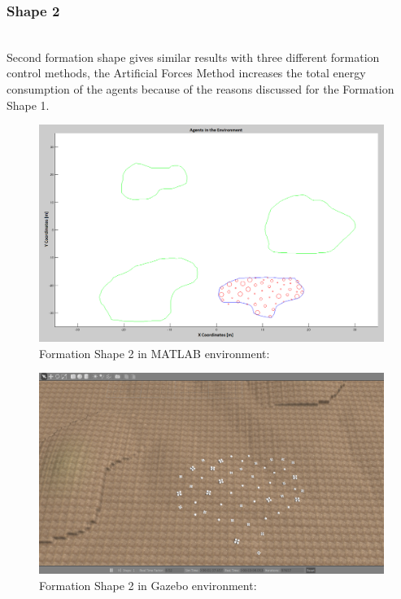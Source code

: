 \subsubsection{Shape 2}\hspace{0pt} \\
Second formation shape gives similar results with three different formation control methods, the Artificial Forces Method increases the total energy consumption of the agents because of the reasons discussed for the Formation Shape 1.

\begin{figure}[H]
\caption{Formation Shape 2 in MATLAB environment:}
\centerline{\includegraphics[scale = 0.40]{Trajectories_Formation_Shape_2_2}}
\end{figure} 	
		   
\begin{figure}[H]
\caption{Formation Shape 2 in Gazebo environment:}
\centerline{\includegraphics[scale = 0.35]{Trajectories_Formation_Shape_2_1}}
\end{figure} 	
		   
